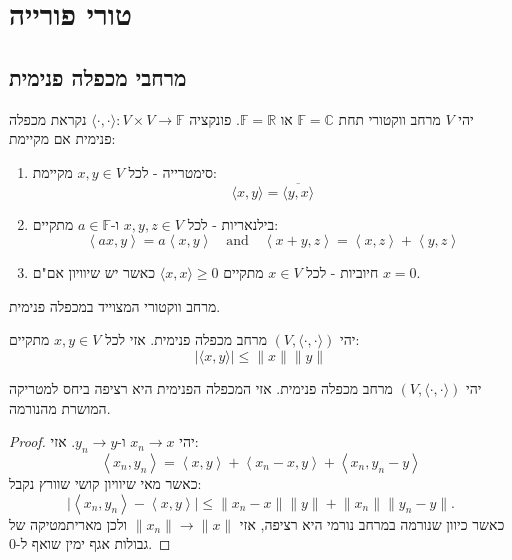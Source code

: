 \documentclass{tstextbook}
\begin{document}
\chapter{טורי פורייה}

\section{מרחבי מכפלה פנימית}

\begin{definition}
יהי \(V\) מרחב ווקטורי תחת \(\mathbb{F}=\mathbb{C}\) או \(\mathbb{F}=\mathbb{R}\). פונקציה \(\langle \cdot,\cdot \rangle:V\times V\to \mathbb{F}\) נקראת מכפלה פנימית אם מקיימת:

  \begin{enumerate}
    \item סימטרייה - לכל \(x,y \in V\) מקיימת: 
$$\big\langle x,y\big\rangle={\overline{{\big\langle y,x\big\rangle}}}$$


    \item בילנאריות - לכל \(x,y,z \in V\) ו-\(a \in \mathbb{F}\) מתקיים: 
$$\left\langle a x,y\right\rangle=a\left\langle x,y\right\rangle\quad \text{and}\quad\left\langle x+y,z\right\rangle=\left\langle x,z\right\rangle+\left\langle y,z\right\rangle$$


    \item חיוביות - לכל \(x \in V\) מתקיים \(\langle x,x \rangle\geq 0\) כאשר יש שיוויון אם"ם \(x=0\). 


  \end{enumerate}
\end{definition}
\begin{definition}
מרחב ווקטורי המצוייד במכפלה פנימית.

\end{definition}
\begin{proposition}
יהי \((V,\langle \cdot,\cdot \rangle)\) מרחב מכפלה פנימית. אזי לכל \(x,y \in V\) מתקיים:
$$\lvert \langle x,y \rangle  \rvert \leq  \lVert x \rVert \lVert y \rVert $$

\end{proposition}
\begin{proposition}
יהי \((V,\langle \cdot,\cdot \rangle)\) מרחב מכפלה פנימית. אזי המכפלה הפנימית היא רציפה ביחס למטריקה המושרת מהנורמה.

\end{proposition}
\begin{proof}
יהי \(x_{n}\to x\) ו-\(y_{n}\to y\). אזי:
$$\left\langle x_{n},y_{n}\right\rangle=\left\langle x,y\right\rangle+\left\langle x_{n}-x,y\right\rangle+\left\langle x_{n},y_{n}-y\right\rangle$$
כאשר מאי שיוויון קושי שוורץ נקבל:
$$\big|\left\langle x_{n},y_{n}\right\rangle-\left\langle x,y\right\rangle\big|\leq\big\|x_{n}-x\big\|\big\|y\big\|+\big\|x_{n}\big\|\big\|y_{n}-y\big\|.$$
כאשר כיוון שנורמה במרחב נורמי היא רציפה, אזי \(\lVert x_{n} \rVert\to \lVert x \rVert\) ולכן מאריתמטיקה של גבולות אגף ימין שואף ל-0.

\end{proof}
\end{document}
